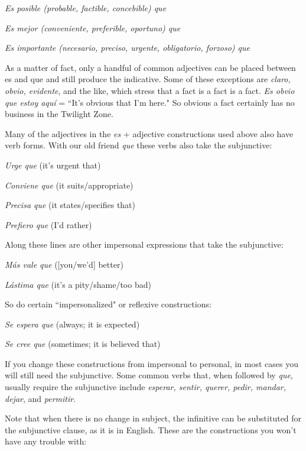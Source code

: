 \bsk

\indu \emph{Es posible (probable, factible, concebible) que}

\indu \emph{Es mejor (conveniente, preferible, oportuno) que}

\indu \emph{Es importante (necesario, preciso, urgente, obligatorio,
forzoso) que}

\bsk

As a matter of fact, only a handful of common adjectives can
be placed between es and que and still produce the indicative. Some of
these exceptions are \emph{claro, obvio, evidente}, and the like, which stress
that a fact is a fact is a fact. \emph{Es obvio que estoy aquí} = ``It's obvious
that I'm here." So obvious a fact certainly has no business in the Twilight Zone.

Many of the adjectives in the \emph{es} + adjective constructions
used above also have verb forms. With our old friend \emph{que} these verbs
also take the subjunctive:

\bsk

\indu \emph{Urge que} (it's urgent that)

\indu \emph{Conviene que} (it suits/appropriate)

\indu \emph{Precisa que} (it states/specifies that)

\indu \emph{Prefiero que} (I'd rather)

\bsk

Along these lines are other impersonal expressions that take
the subjunctive:

\bsk

\indu \emph{Más vale que} ([you/we'd] better)

\indu \emph{Lástima que} (it's a pity/shame/too bad)

\bsk

So do certain ``impersonalized" or reflexive constructions:

\bsk

\indu \emph{Se espera que} (always; it is expected)

\indu \emph{Se cree que} (sometimes; it is believed that)

\bsk

If you change these constructions from impersonal to personal, in
most cases you will still need the subjunctive. Some common verbs
that, when followed by \emph{que}, usually require the subjunctive include
\emph{esperar, sentir, querer, pedir, mandar, dejar}, and \emph{permitir}.

Note that when there is no change in subject, the infinitive
can be substituted for the subjunctive clause, as it is in English. These
are the constructions you won't have any trouble with:

